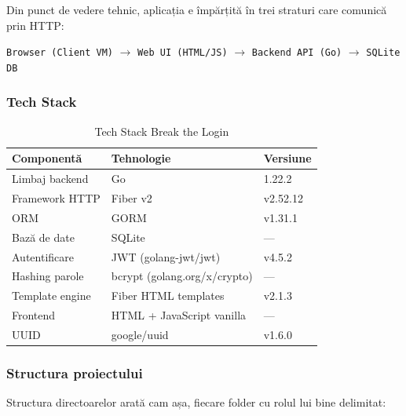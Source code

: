 \documentclass[12pt]{article}
\begin{document}
Din punct de vedere tehnic, aplicația e împărțită în trei straturi care comunică prin HTTP:

\begin{center}
\texttt{Browser (Client VM)} $\longrightarrow$ \texttt{Web UI (HTML/JS)} $\longrightarrow$
\texttt{Backend API (Go)} $\longrightarrow$ \texttt{SQLite DB}
\end{center}

\subsubsection{Tech Stack}

\begin{table}[H]
\centering
\begin{tabular}{|l|l|l|}
\hline
\textbf{Componentă} & \textbf{Tehnologie} & \textbf{Versiune} \\
\hline
Limbaj backend      & Go                          & 1.22.2 \\
Framework HTTP      & Fiber v2                    & v2.52.12 \\
ORM                 & GORM                        & v1.31.1 \\
Bază de date        & SQLite                      & --- \\
Autentificare       & JWT (golang-jwt/jwt)        & v4.5.2 \\
Hashing parole      & bcrypt (golang.org/x/crypto)& --- \\
Template engine     & Fiber HTML templates        & v2.1.3 \\
Frontend            & HTML + JavaScript vanilla   & --- \\
UUID                & google/uuid                 & v1.6.0 \\
\hline
\end{tabular}
\caption{Tech Stack Break the Login}
\end{table}

\subsubsection{Structura proiectului}

Structura directoarelor arată cam așa, fiecare folder cu rolul lui bine delimitat:
\end{document}
